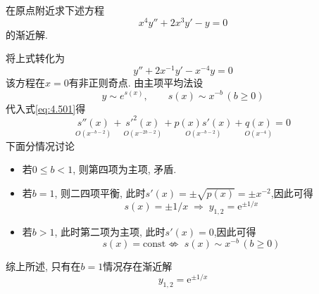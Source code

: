 \begin{problem}[习题4.5]
在原点附近求下述方程
\[
x^4y''+2x^3y'-y=0
\]
的渐近解.
\end{problem}

\begin{solution}
将上式转化为
\begin{equation}
y''+2x^{-1}y'-x^{-4}y=0\label{eq:4.501}
\end{equation}
该方程在$x=0$有非正则奇点. 由主项平均法设
\[
y\sim e^{s(x)},\qquad s(x)\sim x^{-b}\,(b\geq0)
\]
代入式\ref{eq:4.501}得
\[
\underset{O(x^{-b-2})}{s''(x)}+\underset{O(x^{-2b-2})}{s'^{2}(x)}+\underset{O(x^{-b-2})}{p(x)s'(x)}+\underset{O(x^{-4})}{q(x)}=0
\]
下面分情况讨论
\begin{itemize}
\item 若$0\leq b<1$, 则第四项为主项, 矛盾.
\item 若$b=1$, 则二四项平衡, 此时$s'(x)=\pm\sqrt{p(x)}=\pm x^{-2}$,因此可得
\[
s(x)=\pm1/x\;\Longrightarrow\; y_{1,2}=\mathrm{e}^{\pm1/x}
\]

\item 若$b>1$, 此时第二项为主项, 此时$s'(x)=0$,因此可得
\[
s(x)=\mathrm{const}\nLeftrightarrow\; s(x)\sim x^{-b}\,(b\geq0)
\]

\end{itemize}
综上所述, 只有在$b=1$情况存在渐近解
\[
y_{1,2}=\mathrm{e}^{\pm1/x}
\]
\end{solution}
